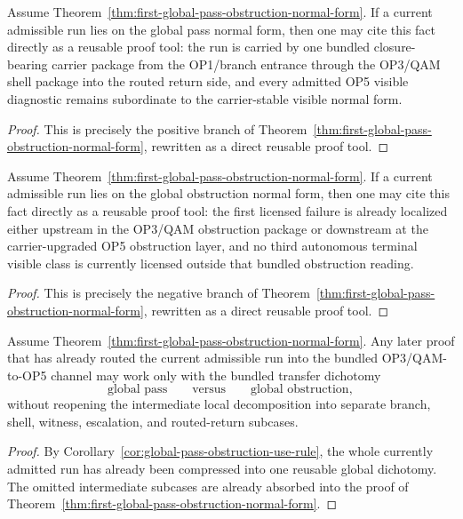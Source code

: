 \begin{proposition}
\label{prop:global-pass-tool}
Assume Theorem~\ref{thm:first-global-pass-obstruction-normal-form}. If a current admissible run lies on the global pass normal form, then one may cite this fact directly as a reusable proof tool: the run is carried by one bundled closure-bearing carrier package from the OP1/branch entrance through the OP3/QAM shell package into the routed return side, and every admitted OP5 visible diagnostic remains subordinate to the carrier-stable visible normal form.
\end{proposition}

\begin{proof}
This is precisely the positive branch of Theorem~\ref{thm:first-global-pass-obstruction-normal-form}, rewritten as a direct reusable proof tool.
\end{proof}

\begin{proposition}
\label{prop:global-obstruction-tool}
Assume Theorem~\ref{thm:first-global-pass-obstruction-normal-form}. If a current admissible run lies on the global obstruction normal form, then one may cite this fact directly as a reusable proof tool: the first licensed failure is already localized either upstream in the OP3/QAM obstruction package or downstream at the carrier-upgraded OP5 obstruction layer, and no third autonomous terminal visible class is currently licensed outside that bundled obstruction reading.
\end{proposition}

\begin{proof}
This is precisely the negative branch of Theorem~\ref{thm:first-global-pass-obstruction-normal-form}, rewritten as a direct reusable proof tool.
\end{proof}

\begin{proposition}
\label{prop:global-transfer-tool}
Assume Theorem~\ref{thm:first-global-pass-obstruction-normal-form}. Any later proof that has already routed the current admissible run into the bundled OP3/QAM-to-OP5 channel may work only with the bundled transfer dichotomy
\[
\text{global pass}
\qquad\text{versus}\qquad
\text{global obstruction},
\]
without reopening the intermediate local decomposition into separate branch, shell, witness, escalation, and routed-return subcases.
\end{proposition}

\begin{proof}
By Corollary~\ref{cor:global-pass-obstruction-use-rule}, the whole currently admitted run has already been compressed into one reusable global dichotomy. The omitted intermediate subcases are already absorbed into the proof of Theorem~\ref{thm:first-global-pass-obstruction-normal-form}.
\end{proof}

